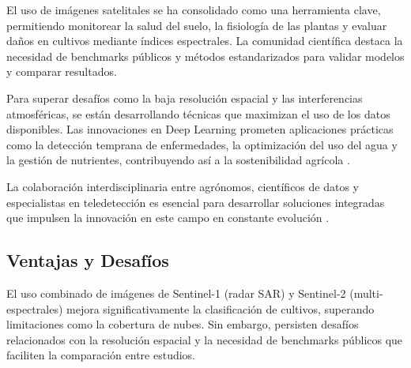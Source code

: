 El uso de imágenes satelitales se ha consolidado como una herramienta clave, permitiendo monitorear la salud del suelo, la fisiología de las plantas y evaluar daños en cultivos mediante índices espectrales. La comunidad científica destaca la necesidad de benchmarks públicos y métodos estandarizados para validar modelos y comparar resultados.

Para superar desafíos como la baja resolución espacial y las interferencias atmosféricas, se están desarrollando técnicas que maximizan el uso de los datos disponibles. Las innovaciones en Deep Learning prometen aplicaciones prácticas como la detección temprana de enfermedades, la optimización del uso del agua y la gestión de nutrientes, contribuyendo así a la sostenibilidad agrícola \cite{sepulveda2020}.

La colaboración interdisciplinaria entre agrónomos, científicos de datos y especialistas en teledetección es esencial para desarrollar soluciones integradas que impulsen la innovación en este campo en constante evolución \cite{nasa_arset_2023}.

\subsection{Ventajas y Desafíos}

El uso combinado de imágenes de Sentinel-1 (radar SAR) y Sentinel-2 (multi-espectrales) mejora significativamente la clasificación de cultivos, superando limitaciones como la cobertura de nubes. Sin embargo, persisten desafíos relacionados con la resolución espacial y la necesidad de benchmarks públicos que faciliten la comparación entre estudios.

